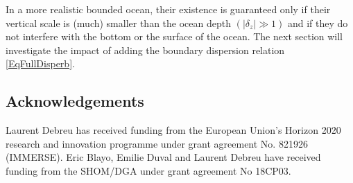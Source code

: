 \documentclass[a4paper,11pt]{article}
\begin{document}

In a more realistic bounded ocean, their existence is guaranteed only if their vertical scale is (much) smaller than the ocean depth $(|\delta_z| \gg 1)$ and if they do not interfere with the bottom or the surface of the ocean. The next section will investigate the impact of adding the boundary dispersion relation \ref{EqFullDisperb}.



\subsection*{Acknowledgements}
Laurent Debreu has received funding from the European Union's Horizon 2020 research and innovation programme under grant agreement No. 821926 (IMMERSE). Eric Blayo, Emilie Duval and Laurent Debreu have received funding from the SHOM/DGA under grant agreement No 18CP03.




\end{document}
